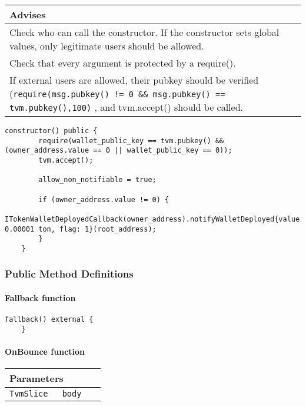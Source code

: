 \ifsoldraft
\noindent\begin{tabular}{|p{12cm}|}\hline
\rowcolor{green}Advises
\\\hline
Check who can call the constructor. If the constructor sets global values, only legitimate users should be allowed.
\\\hline
Check that every argument is protected by a require().
\\\hline
If external users are allowed, their pubkey should be verified (\verb+require(msg.pubkey() != 0 && msg.pubkey() == tvm.pubkey(),100)+ , and tvm.accept() should be called.
\\\hline\end{tabular}
\fi
\vspace{2cm}

\begin{lstlisting}[firstnumber=43]
    constructor() public {
        require(wallet_public_key == tvm.pubkey() && (owner_address.value == 0 || wallet_public_key == 0));
        tvm.accept();

        allow_non_notifiable = true;

        if (owner_address.value != 0) {
            ITokenWalletDeployedCallback(owner_address).notifyWalletDeployed{value: 0.00001 ton, flag: 1}(root_address);
        }
    }
\end{lstlisting}

\subsubsection{Public Method Definitions}


\paragraph{Fallback function}

\vspace{2cm}

\begin{lstlisting}[firstnumber=683]
    fallback() external {
    }
\end{lstlisting}

\paragraph{OnBounce function}


\ifsoltables
\noindent\begin{tabular}{|l|l|p{5cm}|}\hline
\multicolumn{3}{|l|}{\bf Parameters}\\\hline
\tt TvmSlice & \tt body &\\\hline
\end{tabular}
\fi

